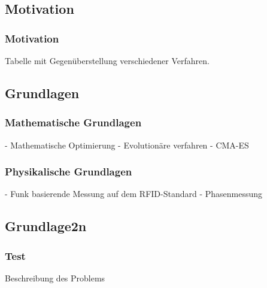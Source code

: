 \subsection{Motivation}
\begin{frame} %
  \frametitle{Motivation}
  
  	Tabelle mit Gegenüberstellung verschiedener Verfahren.
  	
\end{frame}

\newtheorem{fazit}{Fazit} 


\subsection{Grundlagen}
\begin{frame} %
  \frametitle{Mathematische Grundlagen}
  	- Mathematische Optimierung
	- Evolutionäre verfahren
	- CMA-ES
\end{frame}

\begin{frame} %
  \frametitle{Physikalische Grundlagen}
	- Funk basierende Messung auf dem RFID-Standard 
	- Phasenmessung
\end{frame}

\subsection{Grundlage2n}
\begin{frame} %
  \frametitle{Test}
  \begin{test} %
    Beschreibung des Problems
  \end{test}
\end{frame}
